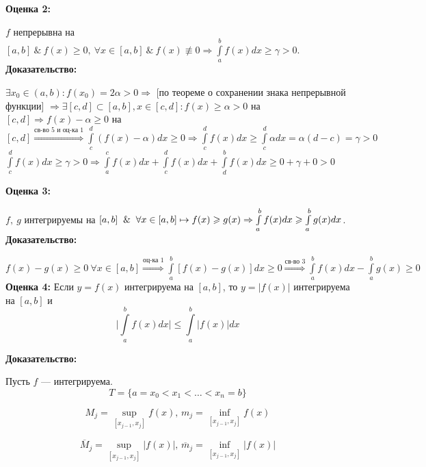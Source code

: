 \documentclass[a4paper,12pt]{article} %
\renewcommand {\geq}{\geqslant}
\renewcommand {\leq}{\leqslant}
\begin{document}
\textbf{Оценка 2:}
    
    $f$ непрерывна на $[a,b] ~ \& ~ f(x) \geqslant 0, ~\forall x \in [a,b] ~ \& ~ f(x) \not \equiv 0 \Rightarrow \int \limits_a^b f(x) dx \geqslant \gamma >0$.\\
    
    \textbf{Доказательство:}
    
    $\exists x_0 \in (a,b): f(x_0) = 2\alpha>0 \Rightarrow$ [по теореме о сохранении знака непрерывной функции] $\Rightarrow \exists [c,d] \subset [a,b], x  \in [c,d]: f(x)\geq \alpha > 0 $ на $[c,d]\Rightarrow f(x)-\alpha \geq 0$ на $[c,d]\stackrel{\text{св-во 5 и оц-ка 1}}{\Rightarrow}\int \limits_c^d (f(x)-\alpha) dx\geq 0 \Rightarrow \int \limits_c^d f(x)dx\geq \int\limits_c^d\alpha dx = \alpha(d-c) = \gamma > 0$\\[2mm]
    $\int \limits_c^d f(x) dx \geq \gamma > 0 \Rightarrow \int \limits_a^c  f(x) dx  + \int \limits_c^d  f(x) dx+ \int \limits_d^b  f(x) dx \geq 0+\gamma+0>0$
    
    \textbf{Оценка 3:}
    
    $f,~g$ интегрируемы на $[a,b] \And \forall x \in [a,b]\mapsto f(x)\geq g(x) \Rightarrow\int \limits_a^b f(x) dx \geq \int \limits_a^b g(x) dx$.\\
    
    \textbf{Доказательство:}
    
    $f(x)-g(x) \geq 0 ~\forall x \in [a,b] \stackrel{\text{оц-ка 1}}{\Rightarrow} \int \limits_a^b [f(x)-g(x)]dx\geq 0 \stackrel{\text{св-во 3}}{\Rightarrow}\int \limits_a^b f(x)dx - \int \limits_a^b g(x) \geq 0 $\\[2mm]
    
    \textbf{Оценка 4:}
    Если $ y = f (x) $ интегрируема на $ [a,b] $, то $ y = |f(x)| $ интегрируема на $ [a, b]$ и \vspace*{1mm} \hspace*{50mm} $$\bigg|\int\limits_a^b f(x)dx\bigg| \leq \int\limits_a^b |f(x)|dx $$
    
    \textbf{Доказательство:}
    
    Пусть $f$ --- интегрируема.
    $$ T = \{ a = x_0 < x_1 < \dots < x_n = b \}$$
    
    $$ M_j = \sup\limits_{[x_{j - 1}, x_j]} f(x) \text{, }m_j =  \inf\limits_{[x_{j - 1}, x_j]} f(x) $$
    
     $$ \overline{M}_j = \sup\limits_{[x_{j - 1}, x_j]} |f(x)| \text{, }\overline{m}_j =  \inf\limits_{[x_{j - 1}, x_j]} |f(x)| $$
     
\end{document}
